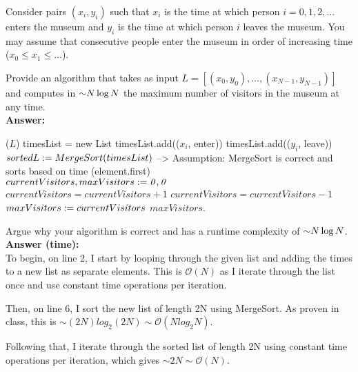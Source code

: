 \begin{problem}
Consider pairs $(x_i, y_i)$ such that $x_i$ is the time at which person $i = 0, 1, 2 , \dots$ enters the museum and $y_i$ is the time at which person $i$ leaves the museum.  You may assume that consecutive people enter the museum in order of increasing time ($x_0 \leq x_1 \leq \dots$).
\begin{questions}
\item Provide an algorithm  that takes as input $L = [(x_0, y_0), \dots, (x_{N-1}, y_{N-1})]$ and computes in $\mathord{\sim}N \log N$ the maximum number of visitors in the museum at any time.\\
\textbf{Answer:}\\

\begin{myalgo}{($L$)}
    \STATE timesList = new List
        \STATE timesList.add(($x_i$, enter))
        \STATE timesList.add(($y_i$, leave))
    \ENDFOR
    \STATE $sortedL := MergeSort(timesList)$ --> Assumption: MergeSort is correct and sorts based on time (element.first)\\
    \STATE $currentVisitors, maxVisitors := \textit{0\/}, \textit{0\/}$\\
       \STATE {}
            \STATE $currentVisitors = currentVisitors + 1$
            \STATE $currentVisitors = currentVisitors - 1$
        \ENDIF
            \STATE $maxVisitors := currentVisitors$
        \ENDIF
    \ENDFOR
    \RETURN $maxVisitors$.
\end{myalgo}

\item Argue why your algorithm  is correct and has a runtime complexity of $\mathord{\sim}N \log N$.\\
\textbf{Answer (time):}\\
To begin, on line 2, I start by looping through the given list and adding the times to a new list as separate elements. This is $\mathcal{O}(N)$ as I iterate through the list once and use constant time operations per iteration.

Then, on line 6, I sort the new list of length 2N using MergeSort. As proven in class, this is $\sim (2N)log_2(2N) \sim \mathcal{O}(Nlog_2N)$.

Following that, I iterate through the sorted list of length 2N using constant time operations per iteration, which gives $\sim 2N \sim \mathcal{O}(N)$.


\end{questions}
\end{problem}
